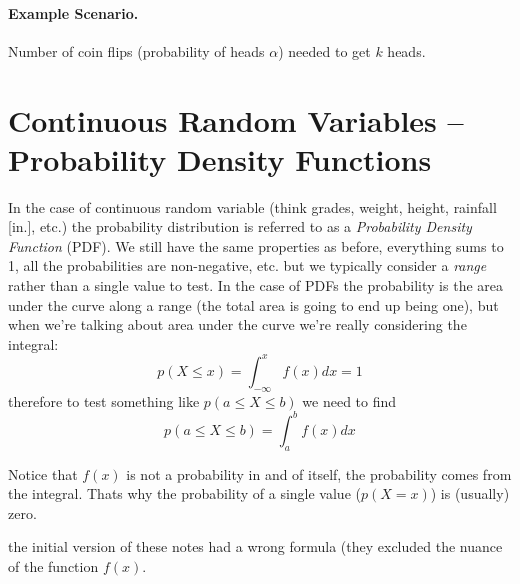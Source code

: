 \paragraph{Example Scenario.} Number of coin flips (probability of heads $\alpha$) needed to get $k$ heads. 

\begin{center}
\end{center}

\section{Continuous Random Variables -- Probability Density Functions}
In the case of continuous random variable (think grades, weight, height, rainfall [in.], etc.) 
the probability distribution is referred to as a \emph{Probability Density Function} (PDF). 
We still have the same properties as before, everything sums to 1, all the probabilities are non-negative, etc.
but we typically consider a \textit{range} rather than a single value to test. 
In the case of PDFs the probability is the area under the curve along a range (the total area is going to end up being one), 
but when we're talking about area under the curve we're really considering the integral:
\[p(X\le x) = \int_{-\infty}^x f(x) dx = 1\]
therefore to test something like $p(a \le X \le b)$ we need to find
\[p(a \le X \le b) = \int_{a}^{b} f(x)dx \]

Notice that $f(x)$ is not a probability in and of itself, the probability comes from the integral. 
Thats why the probability of a single value ($p(X=x)$) is (usually) zero. 

\begin{aside}
the initial version of these notes had a wrong formula (they excluded the nuance of the function $f(x)$. 
\end{aside}


